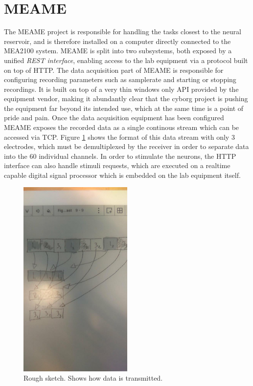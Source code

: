 \section{MEAME}
The MEAME project is responsible for handling the tasks closest to the neural
reservoir, and is therefore installed on a computer directly connected to the
MEA2100 system.
MEAME is split into two subsystems, both exposed by a unified \emph{REST
  interface}, enabling access to the lab equipment via a protocol built on top
of HTTP.
The data acquisition part of MEAME is responsible for configuring recording
parameters such as samplerate and starting or stopping recordings.
It is built on top of a very thin windows only API provided by the equipment vendor, making
it abundantly clear that the cyborg project is pushing the equipment far beyond
its intended use, which at the same time is a point of pride and pain.
Once the data acquisition equipment has been configured MEAME exposes the
recorded data as a single continous stream which can be accessed via TCP.
Figure \ref{figLayout} shows the format of this data stream with only 3
electrodes, which must be demultiplexed by the receiver in order to separate
data into the 60 individual channels.
In order to stimulate the neurons, the HTTP interface can also handle stimuli
requests, which are executed on a realtime capable digital signal processor
which is embedded on the lab equipment itself.
\begin{figure}[h!]
  \centering
  \includegraphics[width=0.5\textwidth]{fig/rm/waveform_segmentation.jpg}
  \caption{Rough sketch.
    Shows how data is transmitted.
  }
  \label{figLayout}
\end{figure}
